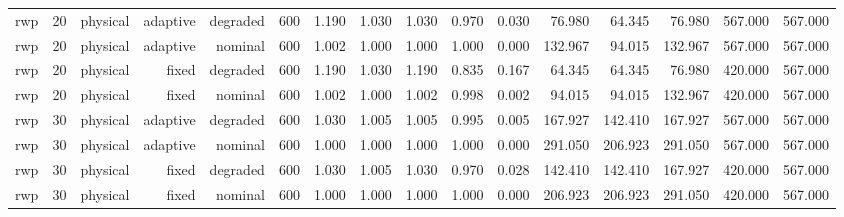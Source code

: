 \begin{tabular}{lrrrrrrrrrrrrrrr}
rwp & 20 & physical & adaptive & degraded & 600 & 1.190 & 1.030 & 1.030 & 0.970 & 0.030 & 76.980 & 64.345 & 76.980 & 567.000 & 567.000 \\
rwp & 20 & physical & adaptive & nominal & 600 & 1.002 & 1.000 & 1.000 & 1.000 & 0.000 & 132.967 & 94.015 & 132.967 & 567.000 & 567.000 \\
rwp & 20 & physical & fixed & degraded & 600 & 1.190 & 1.030 & 1.190 & 0.835 & 0.167 & 64.345 & 64.345 & 76.980 & 420.000 & 567.000 \\
rwp & 20 & physical & fixed & nominal & 600 & 1.002 & 1.000 & 1.002 & 0.998 & 0.002 & 94.015 & 94.015 & 132.967 & 420.000 & 567.000 \\
rwp & 30 & physical & adaptive & degraded & 600 & 1.030 & 1.005 & 1.005 & 0.995 & 0.005 & 167.927 & 142.410 & 167.927 & 567.000 & 567.000 \\
rwp & 30 & physical & adaptive & nominal & 600 & 1.000 & 1.000 & 1.000 & 1.000 & 0.000 & 291.050 & 206.923 & 291.050 & 567.000 & 567.000 \\
rwp & 30 & physical & fixed & degraded & 600 & 1.030 & 1.005 & 1.030 & 0.970 & 0.028 & 142.410 & 142.410 & 167.927 & 420.000 & 567.000 \\
rwp & 30 & physical & fixed & nominal & 600 & 1.000 & 1.000 & 1.000 & 1.000 & 0.000 & 206.923 & 206.923 & 291.050 & 420.000 & 567.000 \\
\bottomrule
\end{tabular}